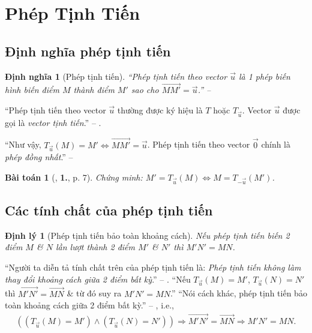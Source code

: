 \documentclass[oneside]{book}
\numberwithin{equation}{section}
\newtheorem{dinhnghia}{Định nghĩa}[section]
\newtheorem{baitoan}{Bài toán}[section]
\newtheorem{dinhly}{Định lý}[section]
\begin{document}

\section{Phép Tịnh Tiến}

\subsection{Định nghĩa phép tịnh tiến}

\begin{dinhnghia}[Phép tịnh tiến]
	``\emph{Phép tịnh tiến} theo vector $\vec{u}$ là 1 phép biến hình biến điểm $M$ thành điểm $M'$ sao cho $\overrightarrow{MM'} = \vec{u}$.'' -- \cite[p. 5]{SGK_Toan_11_hinh_hoc_nang_cao}
\end{dinhnghia}
``Phép tịnh tiến theo vector $\vec{u}$ thường được ký hiệu là $T$ hoặc $T_{\vec{u}}$. Vector $\vec{u}$ được gọi là \textit{vector tịnh tiến}.'' -- \cite[p. 5]{SGK_Toan_11_hinh_hoc_nang_cao}.

``Như vậy, $T_{\vec{u}}(M) = M'\Leftrightarrow\overrightarrow{MM'} = \vec{u}$. Phép tịnh tiến theo vector $\vec{0}$ chính là \textit{phép đồng nhất}.'' -- \cite[p. 5]{SGK_Toan_11_hinh_hoc_co_ban}

\begin{baitoan}[\cite{SGK_Toan_11_dai_so_giai_tich_co_ban}, \textbf{1.}, p. 7]
	\label{prob:phep tinh tien}
	Chứng minh: $M' = T_{\vec{u}}(M)\Leftrightarrow M = T_{-\vec{u}}(M')$.
\end{baitoan}

\subsection{Các tính chất của phép tịnh tiến}

\begin{dinhly}[Phép tịnh tiến bảo toàn khoảng cách]
	\label{thm: phep tinh tien bao toan khoang cach}
	Nếu phép tịnh tiến biến 2 điểm $M$ \& $N$ lần lượt thành 2 điểm $M'$ \& $N'$ thì $M'N' = MN$.
\end{dinhly}
``Người ta diễn tả tính chất trên của phép tịnh tiến là: \textit{Phép tịnh tiến không làm thay đổi khoảng cách giữa 2 điểm bất kỳ}.'' -- \cite[p. 6]{SGK_Toan_11_hinh_hoc_nang_cao}. ``Nếu $T_{\vec{u}}(M) = M'$, $T_{\vec{u}}(N) = N'$ thì $\overrightarrow{M'N'} = \overrightarrow{MN}$ \& từ đó suy ra $M'N' = MN$.'' ``Nói cách khác, phép tịnh tiến bảo toàn khoảng cách giữa 2 điểm bất kỳ.'' -- \cite[p. 6]{SGK_Toan_11_hinh_hoc_co_ban}, i.e.,
\begin{align}
	\label{phep tinh tien bao toan khoang cach}
	((T_{\vec{u}}(M) = M')\land(T_{\vec{u}}(N) = N'))\Rightarrow\overrightarrow{M'N'} = \overrightarrow{MN}\Rightarrow M'N' = MN.
\end{align}
\end{document}
